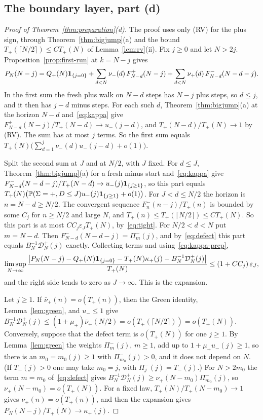 \subsection{The boundary layer, part (d)}\label{sec:prep-boundary}

\begin{proof}[Proof of Theorem~\ref{thm:preparation}(d)]
The proof uses only (RV) for the plus sign, through Theorem~\ref{thm:bigjump}(a) and
the bound $T_\plus(\lceil N/2\rceil)\le CT_\plus(N)$ of Lemma~\ref{lem:rv}(ii). Fix
$j\ge0$ and let $N>2j$. Proposition~\ref{prop:first-run} at $k=N-j$ gives
\[
 P_N(N-j)=Q_{+}(N)\mathbf{1}_{\{j=0\}}+\sum_{d<N}\nu_{-}(d)\,F^{+}_{N-d}(N-j)
 +\sum_{d<N}\nu_{+}(d)\,F^{-}_{N-d}(N-d-j).
\]
In the first sum the fresh plus walk on $N-d$ steps has $N-j$ plus steps, so
$d\le j$, and it then has $j-d$ minus steps. For each such $d$,
Theorem~\ref{thm:bigjump}(a) at the horizon $N-d$ and~\eqref{eq:kappa} give
$F^\plus_{N-d}(N-j)/T_\plus(N-d)\to u_\minus(j-d)$, and $T_\plus(N-d)/T_\plus(N)\to1$ by
(RV). The sum has at most $j$ terms. So the first sum equals
$T_\plus(N)\bigl(\sum_{d=1}^j\nu_\minus(d)u_\minus(j-d)+o(1)\bigr)$.

Split the second sum at $J$ and at $N/2$, with $J$ fixed. For $d\le J$,
Theorem~\ref{thm:bigjump}(a) for a fresh minus start and~\eqref{eq:kappa} give
$F^{-}_{N-d}(N-d-j)/T_{+}(N-d)\to u_{-}(j)\mathbf{1}_{\{j\ge1\}}$, so this part equals
$T_{+}(N)\bigl(\mathbb{P}(\Sigma={+},D\le J)u_{-}(j)\mathbf{1}_{\{j\ge1\}}+o(1)\bigr)$. For
$J<d\le N/2$ the horizon is $n=N-d\ge N/2$. The convergent sequence
$F^\minus_n(n-j)/T_\plus(n)$ is bounded by some $C_j$ for $n\ge N/2$ and large $N$,
and $T_\plus(n)\le T_\plus(\lceil N/2\rceil)\le CT_\plus(N)$. So this part is at
most $CC_j\varepsilon_JT_\plus(N)$, by~\eqref{eq:tight}. For $N/2<d<N$ put $m=N-d$. Then
$F^\minus_{N-d}(N-d-j)=\Pi^\minus_m(j)$, and by~\eqref{eq:defect} this part equals
$B_N^{-1}\mathcal D^\plus_N(j)$ exactly. Collecting terms and using~\eqref{eq:kappa-prep},
\[
 \limsup_{N\to\infty}\frac{\bigl|P_N(N-j)-Q_{+}(N)\mathbf{1}_{\{j=0\}}-T_{+}(N)\kappa_{+}(j)
 -B_N^{-1}\mathcal D^{+}_N(j)\bigr|}{T_{+}(N)}\le(1+CC_j)\,\varepsilon_J,
\]
and the right side tends to zero as $J\to\infty$. This is the expansion.

Let $j\ge1$. If $\bar\nu_\plus(n)=o(T_\plus(n))$, then the Green identity,
Lemma~\ref{lem:green}, and $u_\minus\le1$ give
$B_N^{-1}\mathcal D^\plus_N(j)\le(1+\mu_\plus)\bar\nu_\plus(N/2)
=o(T_\plus(\lceil N/2\rceil))=o(T_\plus(N))$. Conversely, suppose that the defect term is
$o(T_\plus(N))$ for one $j\ge1$. By Lemma~\ref{lem:green}
the weights $\Pi^\minus_m(j)$, $m\ge1$, add up to $1+\mu_\plus u_\minus(j)\ge1$, so
there is an $m_0=m_0(j)\ge1$ with $\Pi^\minus_{m_0}(j)>0$, and it does not depend on
$N$. (If $T_\minus(j)>0$ one may take $m_0=j$, with $\Pi^\minus_j(j)=T_\minus(j)$.)
For $N>2m_0$ the term $m=m_0$ of~\eqref{eq:defect} gives
$B_N^{-1}\mathcal D^\plus_N(j)\ge\nu_\plus(N-m_0)\Pi^\minus_{m_0}(j)$, so
$\nu_\plus(N-m_0)=o(T_\plus(N))$. For a fixed law, $T_\plus(N)/T_\plus(N-m_0)\to1$ gives
$\nu_\plus(n)=o(T_\plus(n))$, and then the expansion gives $P_N(N-j)/T_\plus(N)\to\kappa_\plus(j)$.


\end{proof}
